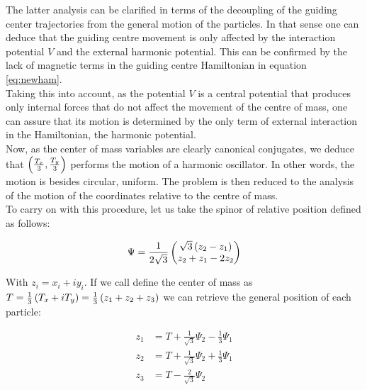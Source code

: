 The latter analysis can be clarified in terms of the decoupling of the guiding center trajectories from the general motion of the particles. In that sense one can deduce that the guiding centre movement is only affected by the interaction potential $V$ and the external harmonic potential. This can be confirmed by the lack of magnetic terms in the guiding centre Hamiltonian in equation \eqref{eq:newham}.\\

Taking this into account, as the potential $V$ is a central potential that produces only internal forces that do not affect the movement of the centre of mass, one can assure that its motion is determined by the only term of external interaction in the Hamiltonian, the harmonic potential.\\

Now, as the center of mass variables are clearly canonical conjugates, we deduce that $\left( \frac{T_x}{3},\frac{T_y}{3} \right)$ performs the motion of a harmonic oscillator. In other words, the motion is besides circular, uniform. The problem is then reduced to the analysis of the motion of the coordinates relative to the centre of mass. \\

To carry on with this procedure, let us take the spinor of relative position defined as follows:

\begin{align}
\Psi = \frac{1}{2\sqrt{3}}\begin{pmatrix}\sqrt{3}\left( z_{2}-z_{1} \right)\\
z_{2}+z_{1}-2z_{2}\end{pmatrix}
\label{eq:spinor}
\end{align}

With $z_{i} = x_i + iy_i$. If we call define the center of mass as $T = \frac{1}{3}\left( T_x + iT_y \right) = \frac{1}{3}\left( z_1 +z_2+z_3 \right)$ we can retrieve the general position of each particle:

\small
\begin{equation}
\begin{aligned}
z_1 &= T+\frac{1}{\sqrt{3}}\Psi_2 - \frac{1}{3}\Psi_1 \\
z_2 &= T+\frac{1}{\sqrt{3}}\Psi_2 + \frac{1}{3}\Psi_1 \\
z_3 &= T-\frac{2}{\sqrt{3}}\Psi_2
\end{aligned}
\label{eq:singlevecs}
\end{equation}
\normalsize

